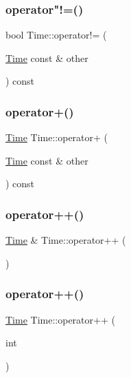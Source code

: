 \mbox{\label{classTime_a04c5a1b7338a14253ab3797afe39316d}} 
\subsubsection{\texorpdfstring{operator"!=()}{operator!=()}}
{\footnotesize\ttfamily bool Time\+::operator!= (\begin{DoxyParamCaption}\item[{\hyperlink{classTime}{Time} const \&}]{other }\end{DoxyParamCaption}) const}

\mbox{\label{classTime_ace5e47a96c86c077b4e42b6713ae70de}} 
\subsubsection{\texorpdfstring{operator+()}{operator+()}}
{\footnotesize\ttfamily \hyperlink{classTime}{Time} Time\+::operator+ (\begin{DoxyParamCaption}\item[{\hyperlink{classTime}{Time} const \&}]{other }\end{DoxyParamCaption}) const}

\mbox{\label{classTime_a55e7ec82d5f390aa1896084e25a0f5a5}} 
\subsubsection{\texorpdfstring{operator++()}{operator++()}\hspace{0.1cm}{\footnotesize\ttfamily [1/2]}}
{\footnotesize\ttfamily \hyperlink{classTime}{Time} \& Time\+::operator++ (\begin{DoxyParamCaption}{ }\end{DoxyParamCaption})}

\mbox{\label{classTime_a9d672dbfc01b4d7f7d5789640017dc37}} 
\subsubsection{\texorpdfstring{operator++()}{operator++()}\hspace{0.1cm}{\footnotesize\ttfamily [2/2]}}
{\footnotesize\ttfamily \hyperlink{classTime}{Time} Time\+::operator++ (\begin{DoxyParamCaption}\item[{int}]{ }\end{DoxyParamCaption})}

